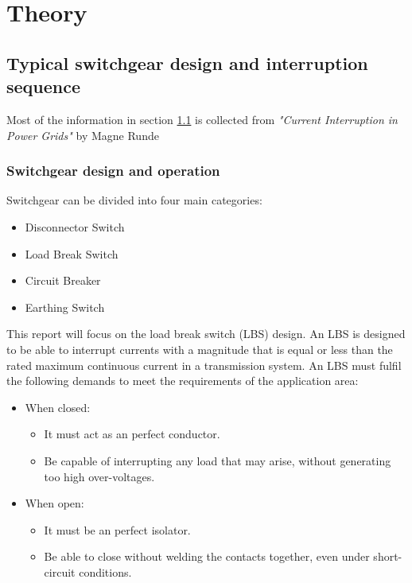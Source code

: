 \documentclass[10pt,a4paper,twoside]{article}
\begin{document}

\cleardoublepage

\section{Theory}
\subsection{Typical switchgear design and interruption sequence} \label{sec:genDes}
Most of the information in section \ref{sec:genDes} is collected from \textit{"Current Interruption in Power Grids"} by Magne Runde \cite{bib:HVEbreak} \newline

\subsubsection{Switchgear design and operation} \label{sec:InterruptCurrent}
Switchgear can be divided into four main categories:
\begin{itemize}
\item Disconnector Switch
\item Load Break Switch
\item Circuit Breaker
\item Earthing Switch
\end{itemize}

This report will focus on the load break switch (LBS) design. An LBS is designed to be able to interrupt currents with a magnitude that is equal or less than the rated maximum continuous current in a transmission system. An LBS must fulfil the following demands to meet the requirements of the application area:

\begin{itemize}
\item When closed:
	\begin{itemize}
		\item It must act as an perfect conductor.
		\item Be capable of interrupting any load that may arise, without generating too high over-voltages. 
	\end{itemize}
\item When open:
	\begin{itemize}
		\item It must be an perfect isolator.
		\item Be able to close without welding the contacts together, even under short-circuit conditions.
	\end{itemize}
\end{itemize}
\end{document}

